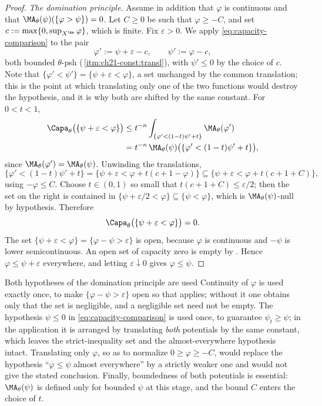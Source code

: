\begin{proof}
\emph{The domination principle.}  Assume in addition that \(\varphi\) is
continuous and that \(\MA_\theta(\psi)(\{\varphi>\psi\})=0\).  Let \(C\geq0\)
be such that \(\varphi\geq-C\), and set
\(c:=\max\{0,\sup_{X^{\An}}\varphi\}\), which is finite.  Fix
\(\varepsilon>0\).  We apply \eqref{eq:capacity-comparison} to the pair
\[
 \varphi':=\psi+\varepsilon-c,\qquad
 \psi':=\varphi-c ,
\]
both bounded \(\theta\)-psh
(\,\cref{itm:ch21-const:transl}), with
\(\psi'\leq0\) by the choice of \(c\).  Note that
\(\{\varphi'<\psi'\}=\{\psi+\varepsilon<\varphi\}\), a set unchanged by the
common translation; this is the point at which translating only one of the
two functions would destroy the hypothesis, and it is why both are shifted
by the same constant.  For \(0<t<1\),
\[
 \begin{aligned}
 \Capa_\theta\bigl(\{\psi+\varepsilon<\varphi\}\bigr)
 &\leq t^{-n}
   \int_{\{\varphi'<(1-t)\psi'+t\}}\MA_\theta(\varphi')\\
 &=t^{-n}\,\MA_\theta(\psi)
   \bigl(\{\varphi'<(1-t)\psi'+t\}\bigr),
 \end{aligned}
\]
since \(\MA_\theta(\varphi')=\MA_\theta(\psi)\).  Unwinding the translations,
\[
 \{\varphi'<(1-t)\psi'+t\}
 =\bigl\{\psi+\varepsilon<\varphi+t(c+1-\varphi)\bigr\}
 \subseteq\bigl\{\psi+\varepsilon<\varphi+t(c+1+C)\bigr\},
\]
using \(-\varphi\leq C\).  Choose \(t\in(0,1)\) so small that
\(t(c+1+C)\leq\varepsilon/2\); then the set on the right is contained in
\(\{\psi+\varepsilon/2<\varphi\}\subseteq\{\psi<\varphi\}\), which is
\(\MA_\theta(\psi)\)-null by hypothesis.  Therefore
\[
 \Capa_\theta\bigl(\{\psi+\varepsilon<\varphi\}\bigr)=0 .
\]
The set \(\{\psi+\varepsilon<\varphi\}=\{\varphi-\psi>\varepsilon\}\) is
open, because \(\varphi\) is continuous and \(-\psi\) is lower
semicontinuous.  An open set of capacity zero is empty by
.  Hence
\(\varphi\leq\psi+\varepsilon\) everywhere, and letting
\(\varepsilon\downarrow0\) gives \(\varphi\leq\psi\).
\end{proof}

\begin{warning}{Both hypotheses of the domination principle are used}
Continuity of \(\varphi\) is used exactly once, to make
\(\{\varphi-\psi>\varepsilon\}\) open so that
 applies; without it one obtains only
that the set is negligible, and a negligible set need not be empty.  The
hypothesis \(\psi\leq0\) in \eqref{eq:capacity-comparison} is used once, to
guarantee \(\psi_t\geq\psi\); in the application it is arranged by
translating \emph{both} potentials by the same constant, which leaves the
strict-inequality set and the almost-everywhere hypothesis intact.
Translating only \(\varphi\), so as to normalize \(0\geq\varphi\geq-C\),
would replace the hypothesis ``\(\varphi\leq\psi\) almost everywhere'' by a
strictly weaker one and would not give the stated conclusion.  Finally,
boundedness of both potentials is essential: \(\MA_\theta(\psi)\) is defined
only for bounded \(\psi\) at this stage, and the bound \(C\) enters the
choice of \(t\).
\end{warning}

